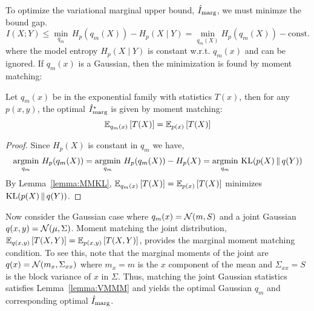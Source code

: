 To optimize the variational marginal upper bound, $\hat{I}_{\text{marg}}$, we must minimze the
bound gap.
\begin{equation}
  I(X;Y) \leq \min_{q_m} \, H_p(q_m(X))-H_p(X \mid Y) = \min_{q_m(X)}H_p(q_m(X)) - \text{const.}
\end{equation}
where the model entropy $H_p(X \mid Y)$ is constant w.r.t. $q_m(x)$
and can be ignored.  If $q_m(x)$ is a Gaussian, then the minimization
is found by moment matching:
\begin{lemma}
  \label{lemma:VMMM} Let $q_m(x)$ be in the exponential family with
  statistics $T(x)$, then for any $p(x,y)$, the optimal $\hat{I}_{\text{marg}}^*$ is
  given by moment matching: 
  \[
    \mathbb{E}_{q_m(x)}\left[T(X)\right]=\mathbb{E}_{p(x)}\left[T(X)\right]
  \]  
\end{lemma}
\vspace*{-5mm}\begin{proof} Since $H_p(X)$ is constant in $q_m$ we have,
  \[
    \operatorname*{argmin}_{q_m} \, H_p(q_m(X)) = \operatorname*{argmin}_{q_m} \,
    H_p(q_m(X))-H_p(X) = \operatorname*{argmin}_{q_m} \, \mathrm{KL}(p(X)\,\|\,q(Y))
  \]  
  By Lemma~\ref{lemma:MMKL}, $\mathbb{E}_{q_m(x)}\left[T(X)\right]=\mathbb{E}_{p(x)}\left[T(X)\right]$
  minimizes $\mathrm{KL}(p(X)\,\|\,q(Y))$.
\end{proof}
Now consider the Gaussian case where $q_m(x)=\mathcal{N}(m,S)$ and a joint
Gaussian $q(x,y)=\mathcal{N}(\mu,\Sigma)$. Moment matching the joint
distribution,
$\mathbb{E}_{q(x,y)}\left[T(X,Y)\right]=\mathbb{E}_{p(x,y)}\left[T(X,Y)\right]$,
provides the marginal moment matching condition. To see this, note
that the marginal moments of the joint are
$q(x)=\mathcal{N}(m_x,\Sigma_{xx})$ where $m_x=m$ is the $x$ component of
the mean and $\Sigma_{xx}=S$ is the block variance of $x$ in $\Sigma$.
Thus, matching the joint Gaussian statistics satisfies
Lemma~\ref{lemma:VMMM} and yields the optimal Gaussian $q_m$ and
corresponding optimal $\hat{I}_{\text{marg}}$.

